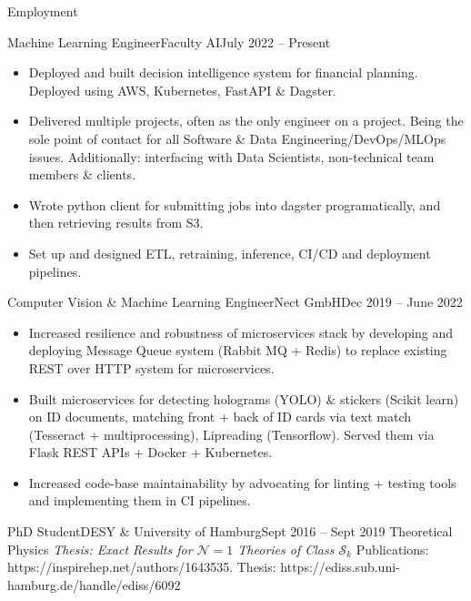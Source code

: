 \documentclass[]{mcdowellcv}
\begin{document}
	\makeheader
	
	\begin{cvsection}{Employment}
		\begin{cvsubsection}{Machine Learning Engineer}{Faculty AI}{July 2022 -- Present}			
			\begin{itemize}
                \item Deployed and built decision intelligence system for financial planning. Deployed using AWS, Kubernetes, FastAPI \& Dagster.
                \item Delivered multiple projects, often as the only engineer on a project. Being the sole point of contact for all Software \& Data Engineering/DevOps/MLOps issues. Additionally: interfacing with Data Scientists, non-technical team members \& clients.
				\item Wrote python client for submitting jobs into dagster programatically, and then retrieving results from S3.
                \item Set up and designed  ETL, retraining, inference, CI/CD and deployment pipelines.
			\end{itemize}
		\end{cvsubsection}
		
		\begin{cvsubsection}[2]{Computer Vision \& Machine Learning Engineer}{Nect GmbH}{Dec 2019 -- June 2022}	
			\begin{itemize}
				\item Increased resilience and robustness of microservices stack by developing and deploying Message Queue system (Rabbit MQ + Redis) to replace existing REST over HTTP system for microservices.
                \item Built microservices for detecting holograms (YOLO) \& stickers (Scikit learn) on ID documents, matching front + back of ID cards via text match (Tesseract + multiprocessing), Lipreading (Tensorflow). Served them via Flask REST APIs + Docker + Kubernetes.
				\item Increased code-base maintainability by advocating for linting + testing tools and implementing them in CI pipelines.
			\end{itemize}
		\end{cvsubsection}
		
		\begin{cvsubsection}{PhD Student}{DESY \& University of Hamburg}{Sept 2016 -- Sept 2019}
            Theoretical Physics \hfill \textit{Thesis: Exact Results for $\mathcal{N}=1$ Theories of Class $\mathcal{S}_k$}\newline
                Publications: https://inspirehep.net/authors/1643535.\newline
                Thesis: https://ediss.sub.uni-hamburg.de/handle/ediss/6092
		\end{cvsubsection}
		

\end{cvsection}
\end{document}
